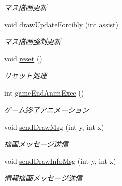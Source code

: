 \begin{DoxyCompactItemize}
\begin{DoxyCompactList}\small\item\em マス描画更新 \end{DoxyCompactList}\item 
void \mbox{\hyperlink{classjp_1_1gr_1_1java__conf_1_1yuta__yoshinaga_1_1reversi_1_1model_1_1_reversi_play_a216cece80255198785a95ccbaf1cef53}{draw\+Update\+Forcibly}} (int assist)
\begin{DoxyCompactList}\small\item\em マス描画強制更新 \end{DoxyCompactList}\item 
void \mbox{\hyperlink{classjp_1_1gr_1_1java__conf_1_1yuta__yoshinaga_1_1reversi_1_1model_1_1_reversi_play_a040fddf6e59c00de4c9c2ecdaedcb574}{reset}} ()
\begin{DoxyCompactList}\small\item\em リセット処理 \end{DoxyCompactList}\item 
int \mbox{\hyperlink{classjp_1_1gr_1_1java__conf_1_1yuta__yoshinaga_1_1reversi_1_1model_1_1_reversi_play_aaf0f07bdc219b6d8ec5551457fb551ab}{game\+End\+Anim\+Exec}} ()
\begin{DoxyCompactList}\small\item\em ゲーム終了アニメーション \end{DoxyCompactList}\item 
void \mbox{\hyperlink{classjp_1_1gr_1_1java__conf_1_1yuta__yoshinaga_1_1reversi_1_1model_1_1_reversi_play_a93ebdb5fb7097984730a85f62ebb57d7}{send\+Draw\+Msg}} (int y, int x)
\begin{DoxyCompactList}\small\item\em 描画メッセージ送信 \end{DoxyCompactList}\item 
void \mbox{\hyperlink{classjp_1_1gr_1_1java__conf_1_1yuta__yoshinaga_1_1reversi_1_1model_1_1_reversi_play_a866c2788aa9dd7eb2084da9fc5e5bd5c}{send\+Draw\+Info\+Msg}} (int y, int x)
\begin{DoxyCompactList}\small\item\em 情報描画メッセージ送信 \end{DoxyCompactList}\end{DoxyCompactItemize}
